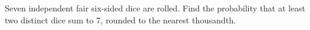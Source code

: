 Seven independent fair six-sided dice are rolled. Find the probability that at least two distinct dice sum to 7, rounded to the nearest thousandth.

